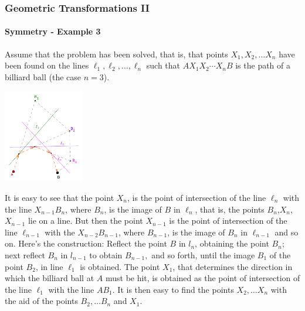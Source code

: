 \documentclass[8pt,xcolor=table,dvipsnames]{beamer}
\begin{document}
\begin{frame}[t]
    \frametitle{Geometric Transformations II}
    \framesubtitle{Symmetry - Example 3}
    Assume that the problem has been solved, that is, that points
    $X_1, X_2, \ldots X_n$ have been found on the lines $\ell_1, \ell_2, \ldots, \ell_n$ such that
    $A X_1 X_2 \cdots X_n B$ is the path of a billiard ball (the case $n = 3$).
    \begin{center}
        \includegraphics[width=3.5cm]{./svg/pdf/symmetry-3b.pdf}
    \end{center}
    \begin{overprint}
        It is easy to see that the point $X_n$, is the point of intersection of the line $\ell_n$ with the line $X_{n-1}B_n$,
        where $B_n$, is the image of $B$ in $\ell_n$, that is, the points $B_n$,$X_n$, $X_{n-1}$ lie on a line.
        \bigbreak
        But then the point $X_{n-1}$ is the point of intersection of the line $\ell_{n-1}$ with the $X_{n-2}B_{n-1}$,
        where $B_{n-1}$, is the image of $B_n$ in $\ell_{n-1}$ and so on.
        Here's the construction: Reflect the point $B$ in $l_n$, obtaining the point $B_n$;
        next reflect $B_n$ in $l_{n-1}$ to obtain $B_{n-1},$ and so forth, until the image $B_1$ of the point $B_2$, in line $\ell_1$ is obtained.
        \bigbreak
        The point $X_1$, that determines the direction in which the billiard ball at $A$ must be hit,
        is obtained as the point of intersection of the line $\ell_1$ with the line $AB_1$.
        It is then easy to find the points $X_2, \ldots X_n$ with the aid of the points $B_2, \ldots B_n$ and $X_1$.
    \end{overprint}
\end{frame}
\end{document}
